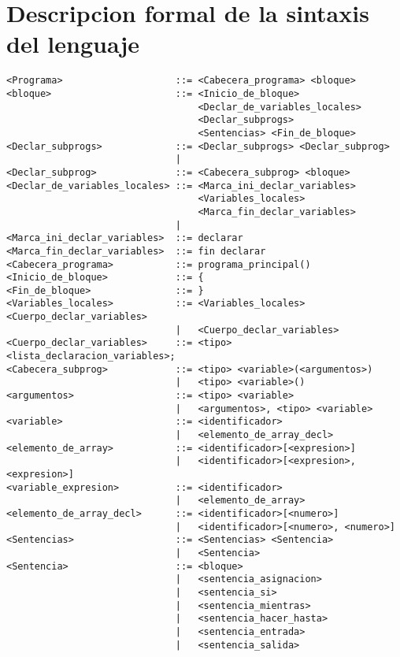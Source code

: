 \section{Descripcion formal de la sintaxis del lenguaje}

\begin{lstlisting}[breaklines=true, basicstyle=\tiny]
<Programa>                    ::= <Cabecera_programa> <bloque>
<bloque>                      ::= <Inicio_de_bloque>
                                  <Declar_de_variables_locales>
                                  <Declar_subprogs>
                                  <Sentencias> <Fin_de_bloque>
<Declar_subprogs>             ::= <Declar_subprogs> <Declar_subprog>
                              |
<Declar_subprog>              ::= <Cabecera_subprog> <bloque>
<Declar_de_variables_locales> ::= <Marca_ini_declar_variables>
                                  <Variables_locales>
                                  <Marca_fin_declar_variables>
                              |
<Marca_ini_declar_variables>  ::= declarar
<Marca_fin_declar_variables>  ::= fin declarar
<Cabecera_programa>           ::= programa_principal()
<Inicio_de_bloque>            ::= {
<Fin_de_bloque>               ::= }
<Variables_locales>           ::= <Variables_locales> <Cuerpo_declar_variables>
                              |   <Cuerpo_declar_variables>
<Cuerpo_declar_variables>     ::= <tipo> <lista_declaracion_variables>;
<Cabecera_subprog>            ::= <tipo> <variable>(<argumentos>)
                              |   <tipo> <variable>()
<argumentos>                  ::= <tipo> <variable>
                              |   <argumentos>, <tipo> <variable>
<variable>                    ::= <identificador>
                              |   <elemento_de_array_decl>
<elemento_de_array>           ::= <identificador>[<expresion>]
                              |   <identificador>[<expresion>, <expresion>]
<variable_expresion>          ::= <identificador>
                              |   <elemento_de_array>
<elemento_de_array_decl>      ::= <identificador>[<numero>]
                              |   <identificador>[<numero>, <numero>]
<Sentencias>                  ::= <Sentencias> <Sentencia>
                              |   <Sentencia>
<Sentencia>                   ::= <bloque>
                              |   <sentencia_asignacion>
                              |   <sentencia_si>
                              |   <sentencia_mientras>
                              |   <sentencia_hacer_hasta>
                              |   <sentencia_entrada>
                              |   <sentencia_salida>

\end{lstlisting}
